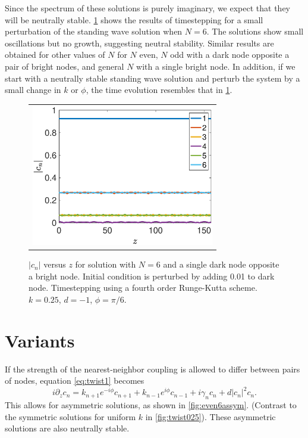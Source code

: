 \documentclass[12pt]{article}
\begin{document}
Since the spectrum of these solutions is purely imaginary, we expect that they will be neutrally stable.  \cref{fig:evenhole6perturbed} shows the results of timestepping for a small perturbation of the standing wave solution when $N=6$. The solutions show small oscillations but no growth, suggesting neutral stability. Similar results are obtained for other values of $N$ for $N$ even, $N$ odd with a dark node opposite a pair of bright nodes, and general $N$ with a single bright node. In addition, if we start with a neutrally stable standing wave solution and perturb the system by a small change in $k$ or $\phi$, the time evolution resembles that in \cref{fig:evenhole6perturbed}.
\begin{figure}[H]
\begin{center}
\begin{tabular}{c}
\includegraphics[width=8cm]{images/evenhole6perturbed.eps}
\end{tabular}
\end{center}
\caption{$|c_n|$ versus $z$ for solution with $N=6$ and a single dark node opposite a bright node. Initial condition is perturbed by adding 0.01 to dark node. Timestepping using a fourth order Runge-Kutta scheme. $k=0.25$, $d=-1$, $\phi=\pi/6$.}
\label{fig:evenhole6perturbed}
\end{figure}

\section{Variants}

If the strength of the nearest-neighbor coupling is allowed to differ between pairs of nodes, equation \cref{eq:twist1} becomes
\begin{equation}\label{eq:twistk}
i \partial_z c_n = k_{n+1} e^{-i\phi}c_{n+1} + k_{n-1} e^{i\phi}c_{n-1} + i \gamma_n c_n + d |c_n|^2 c_n.
\end{equation}
This allows for asymmetric solutions, as shown in \cref{fig:even6assym}. (Contrast to the symmetric solutions for uniform $k$ in \cref{fig:twist025}). These asymmetric solutions are also neutrally stable. 
\end{document}
